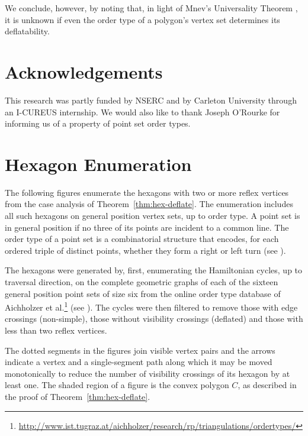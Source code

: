\documentclass{patmorin}
\begin{document}
We conclude, however, by noting that, in light of Mnev's Universality
Theorem \cite{Mnev88}, it is unknown if even the order type of a
polygon's vertex set determines its deflatability.

\section{Acknowledgements}

This research was partly funded by NSERC and by Carleton University
through an I-CUREUS internship.  We would also like to thank Joseph
O'Rourke for informing us of a property of point set order types.

{ \small

{}
}

\iffullversion

\appendix
\section{Hexagon Enumeration}
\label{apx:hexagons}
The following figures enumerate the hexagons with two or more reflex
vertices from the case analysis of Theorem~\ref{thm:hex-deflate}.  The
enumeration includes all such hexagons on general position vertex
sets, up to order type.  A point set is in general position if no
three of its points are incident to a common line.  The order type of
a point set is a combinatorial structure that encodes, for each
ordered triple of distinct points, whether they form a right or left
turn (see \cite{Goodman83}).

The hexagons were generated by, first, enumerating the Hamiltonian
cycles, up to traversal direction, on the complete geometric graphs of
each of the sixteen general position point sets of size six from the
online order type database of Aichholzer et
al.\footnote{\url{http://www.ist.tugraz.at/aichholzer/research/rp/triangulations/ordertypes/}}
(see \cite{Aichholzer02}).  The cycles were then filtered to remove
those with edge crossings (non-simple), those without visibility
crossings (deflated) and those with less than two reflex vertices.

The dotted segments in the figures join visible vertex pairs and the
arrows indicate a vertex and a single-segment path along which it may
be moved monotonically to reduce the number of visibility crossings of
its hexagon by at least one.  The shaded region of a figure is the
convex polygon $C$, as described in the proof of
Theorem~\ref{thm:hex-deflate}.


\fi
\end{document}
